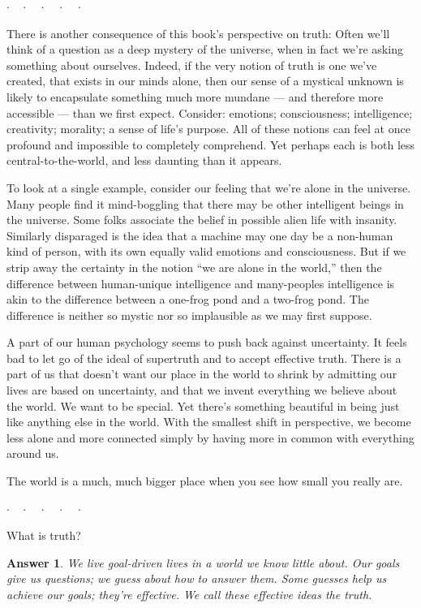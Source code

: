 \documentclass[9pt, twoside]{book}
\newtheorem*{answer}{Answer}
\theoremstyle{argtstyle}
\newcommand{\dotq}{\cdot\quad}
\newcommand{\scenebreak}{
    \medskip\centerline{$\dotq\dotq\dotq\dotq\cdot$}\medskip
}
\begin{document}
\scenebreak

There is another consequence of this book's perspective on truth:
Often we'll think of a question as a deep mystery of the
universe, when in fact we're asking something about ourselves.
Indeed, if the very notion of truth is one we've created, that exists in our
minds alone, then our sense of a mystical unknown is likely to encapsulate
something much more mundane --- and therefore more accessible --- than we first
expect.
Consider:
emotions; consciousness; intelligence; creativity; morality; a sense of life's
purpose. All of these notions can feel at once profound and impossible to
completely comprehend. Yet perhaps each is both less central-to-the-world, and
less daunting than it appears.

To look at a single example, consider our feeling that we're alone in the
universe.
Many people find it mind-boggling
that there may be other intelligent beings in the
universe.
Some folks associate the belief in possible alien life with insanity.
Similarly disparaged is
the idea that a machine may one day be a non-human kind of
person, with its own equally valid emotions and consciousness.
But if we strip away the certainty in the notion ``we are alone
in the world,'' then the difference between human-unique intelligence and
many-peoples intelligence is akin to the difference between a one-frog pond
and a two-frog pond.
The difference is neither so mystic nor so implausible as we may first suppose.

A part of our human psychology seems to push back against uncertainty. It
feels bad to let go of the ideal of supertruth and to accept effective
truth. There is a part of us that doesn't want our place in the world to
shrink by admitting our lives are based on uncertainty, and that we invent
everything we believe about the world.
We want to be special. Yet there's something beautiful in being just
like anything else in the world. With the smallest shift in perspective,
we become
less alone and more connected simply by having more in common with everything
around us.

The world is a much, much bigger place when you see how small you really are.

\scenebreak

What is truth?
\begin{answer}{}
    We live goal-driven lives in a world we know little about.
    Our goals give us questions; we guess about how to answer them.
    Some guesses help us achieve our goals; they're effective.
    We call these effective ideas the {\em truth}.
\end{answer}
\end{document}
